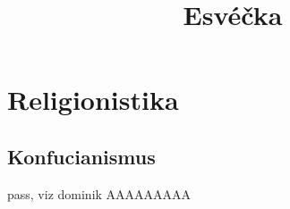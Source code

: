 \documentclass{article}
\title{\vspace{-2cm}Esvéčka\vspace{-1.7cm}}
\date{}
\author{}
\begin{document}
\maketitle

\section{Religionistika}

\subsection{Konfucianismus}
pass, viz dominik AAAAAAAAA
\end{document}
